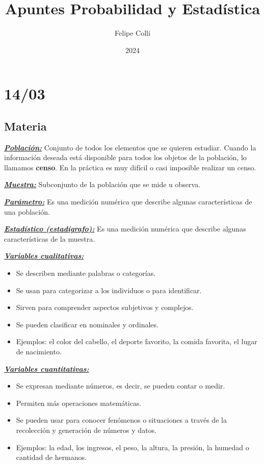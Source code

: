 \documentclass[12pt, letterpaper]{article}
\title{Apuntes Probabilidad y Estadística}
\author{Felipe Colli}
\date{2024}
\begin{document}
\maketitle
\tableofcontents
\newpage %

\section{14/03}
\subsection{Materia}
\textbf{\textit{\underline{Población:}}}
Conjunto de todos los elementos que se quieren estudiar. Cuando la información deseada está disponible para todos los objetos de la población, lo llamamos \textbf{censo}. En la práctica es muy difícil o casi imposible realizar un censo.

\textbf{\textit{\underline{Muestra:}}}
Subconjunto de la población que se mide u observa.

\textbf{\textit{\underline{Parámetro:}}}
Es una medición numérica que describe algunas características de una población. %

\textbf{\textit{\underline{Estadístico (estadígrafo):}}} Es una medición numérica que describe algunas características de la muestra.

\textbf{\textit{\underline{Variables cualitativas:}}}
\begin{itemize}
    \item Se describen mediante palabras o categorías.
    \item Se usan para categorizar a los individuos o para identificar.
    \item Sirven para comprender aspectos subjetivos y complejos.
    \item Se pueden clasificar en nominales y ordinales.
    \item Ejemplos: el color del cabello, el deporte favorito, la comida favorita, el lugar de nacimiento.
\end{itemize}

\textbf{\textit{\underline{Variables cuantitativas:}}}
\begin{itemize}
    \item Se expresan mediante números, es decir, se pueden contar o medir.
    \item Permiten más operaciones matemáticas.
    \item Se pueden usar para conocer fenómenos o situaciones a través de la recolección y generación de números y datos.
    \item Ejemplos: la edad, los ingresos, el peso, la altura, la presión, la humedad o cantidad de hermanos.
\end{itemize}
\end{document}
